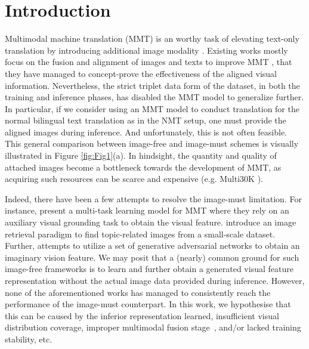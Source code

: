 \documentclass[11pt]{article}
\begin{document}
\section{Introduction}
\label{sec:intro}
Multimodal machine translation (MMT) is an worthy task of elevating text-only translation by introducing additional image modality \cite{specia-etal-2016-shared,elliott-etal-2017-findings,barrault-etal-2018-findings}.
Existing works mostly focus on the fusion and alignment of images and texts to improve MMT \cite{calixto-etal-2017-doubly,ive-etal-2019-distilling,yin-etal-2020-novel}, that they have managed to concept-prove the effectiveness of the aligned visual information.
Nevertheless, the strict triplet data form of the dataset, in both the training and inference phases, has disabled the MMT model to generalize further.
In particular, if we consider using an MMT model to conduct translation for the normal bilingual text translation as in the NMT setup, one must provide the aligned images during inference.
And unfortunately, this is not often feasible.
This general comparison between image-free and image-must schemes is visually illustrated in Figure \ref{fig:Fig1}(a).
In hindsight, the quantity and quality of attached images become a bottleneck towards the development of MMT, as acquiring such resources can be scarce and expensive (e.g. Multi30K \cite{elliott-etal-2016-multi30k}).

Indeed, there have been a few attempts to resolve the image-must limitation.
For instance, \citet{elliott-kadar-2017-imagination} present a multi-task learning model for MMT where they rely on an auxiliary visual grounding task to obtain the visual feature. \citet{Zhang2020Neural} introduce an image retrieval paradigm to find topic-related images from a small-scale dataset. Further, \citet{long-etal-2021-generative} attempts to utilize a set of generative adversarial networks to obtain an imaginary vision feature.
We may posit that a (nearly) common ground for such image-free frameworks is to learn and further obtain a generated visual feature representation without the actual image data provided during inference.
However, none of the aforementioned works has managed to consistently reach the performance of the image-must counterpart.
In this work, we hypothesise that this can be caused by the inferior representation learned, insufficient visual distribution coverage, improper multimodal fusion stage~\cite{caglayan-etal-2017-lium,arslan2018doubly,helcl-etal-2018-cuni,calixto-liu-2017-incorporating}, and/or lacked training stability, etc.
\end{document}
